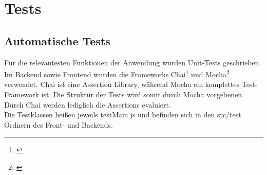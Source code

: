 \section{Tests}\label{Tests}
\subsection{Automatische Tests}
Für die relevantesten Funktionen der Anwendung wurden Unit-Tests geschrieben.
Im Backend sowie Frontend wurden die Frameworks Chai\footnote{\cite{chai}} und Mocha\footnote{\cite{mocha}} verwendet.
Chai ist eine Assertion Library, während Mocha ein komplettes Test-Framework ist.
Die Struktur der Tests wird somit durch Mocha vorgebenen.
Durch Chai werden lediglich die Assertions evaluiert.
\\
Die Testklassen heißen jeweils testMain.js und befinden sich in den src/test Ordnern des Front- und Backends.
\\

